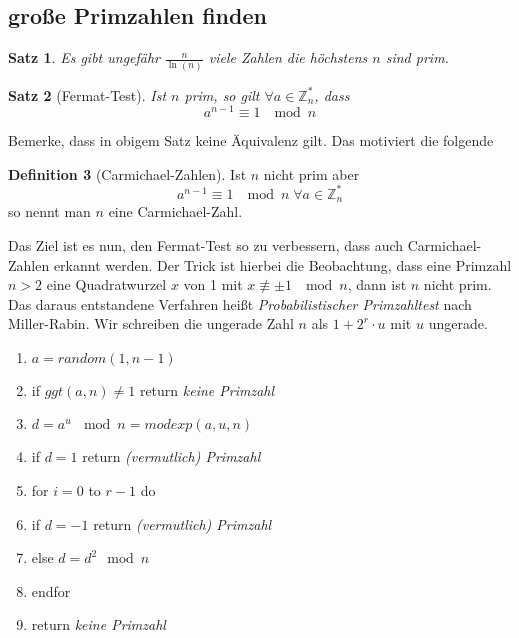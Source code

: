 \documentclass[a4paper, 12pt]{article}
\theoremstyle{plain}
\newtheorem{theorem}{Satz}[subsection] %
\theoremstyle{definition}
\newtheorem{definition}[theorem]{Definition} %
\theoremstyle{lemma}
\theoremstyle{remark}
\theoremstyle{corollary}
\theoremstyle{example}
\begin{document}
	\subsection{große Primzahlen finden}
	\begin{theorem}
		Es gibt ungefähr $\frac{n}{\ln(n)}$ viele Zahlen die höchstens $n$ sind prim.
	\end{theorem}
	\begin{theorem}[Fermat-Test]
		Ist $n$ prim, so gilt $\forall a \in \mathbb{Z}_n^*$, dass \[a^{n-1} \equiv 1 \; \mod n\]
	\end{theorem}
	Bemerke, dass in obigem Satz keine Äquivalenz gilt. Das motiviert die folgende
	\begin{definition}[Carmichael-Zahlen]
		Ist $n$ nicht prim aber \[a^{n-1} \equiv 1 \; \mod n \; \forall a \in \mathbb{Z}_n^*\] so nennt man $n$ eine Carmichael-Zahl.
	\end{definition}
	Das Ziel ist es nun, den Fermat-Test so zu verbessern, dass auch Carmichael-Zahlen erkannt werden. Der Trick ist hierbei die Beobachtung, dass eine Primzahl $n>2$ eine Quadratwurzel $x$ von 1 mit $x \not \equiv \pm 1 \; \mod n$, dann ist $n$ nicht prim. Das daraus entstandene Verfahren heißt \textit{Probabilistischer Primzahltest} nach Miller-Rabin. Wir schreiben die ungerade Zahl $n$ als $1+2^r\cdot u$ mit $u$ ungerade.
	\begin{enumerate}
		\item $a = random(1,n-1)$
		\item if $ggt(a,n) \neq 1$ return \textit{keine Primzahl}
		\item $d = a^u \, \mod n = modexp(a,u,n)$
		\item if $d=1$ return \textit{(vermutlich) Primzahl}
		\item for $i=0$ to $r-1$ do
		\item if $d=-1$ return \textit{(vermutlich) Primzahl}
		\item else $d=d^2 \mod n$
		\item endfor
		\item return \textit{keine Primzahl}
	\end{enumerate}
\end{document}
